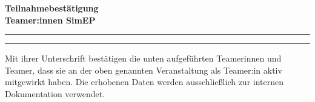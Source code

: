 \documentclass[a4paper,11pt]{article}
\begin{document}
\begin{center}
  {\Large \textbf{\textcolor{headerblue}{Teilnahmebestätigung}}}\\[4pt]
  {\large \textbf{Teamer:innen SimEP}}\\[2pt]
\end{center}

\noindent\rule{\textwidth}{0.8pt}
\vspace{0.2cm}

\noindent
\setlength{\fboxsep}{8pt}
\noindent{}

\vspace{0.35cm}
\noindent\rule{\textwidth}{0.4pt}
\vspace{0.25cm}

\noindent
{\small Mit ihrer Unterschrift bestätigen die unten aufgeführten Teamerinnen und Teamer, dass sie an der oben genannten Veranstaltung als Teamer:in aktiv mitgewirkt haben. Die erhobenen Daten werden ausschließlich zur internen Dokumentation verwendet.}

\vspace{0.35cm}

\noindent
\renewcommand{\arraystretch}{0.95}
\small
\end{document}
